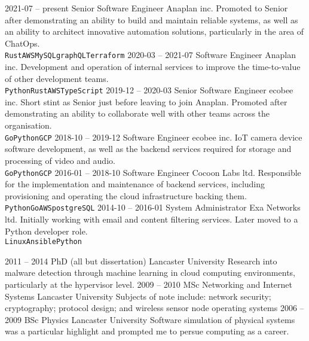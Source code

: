 \documentclass[9pt]{developercv} %
\begin{document}
\begin{entrylist}
	\entry
		{2021-07 -- present}
		{Senior Software Engineer}
		{Anaplan inc.}
		{Promoted to Senior after demonstrating an ability to build and maintain reliable systems, as well as an ability to architect innovative automation solutions, particularly in the area of ChatOps.\\
		\texttt{Rust}\slashsep\texttt{AWS}\slashsep\texttt{MySQL}\slashsep\texttt{graphQL}\slashsep\texttt{Terraform}}
	\entry
		{2020-03 -- 2021-07}
		{Software Engineer}
		{Anaplan inc.}
		{Development and operation of internal services to improve the time-to-value of other development teams.\\
		\texttt{Python}\slashsep\texttt{Rust}\slashsep\texttt{AWS}\slashsep\texttt{TypeScript}}
	\entry
		{2019-12 -- 2020-03}
		{Senior Software Engineer}
		{ecobee inc.}
		{Short stint as Senior just before leaving to join Anaplan. Promoted after demonstrating an ability to collaborate well with other teams across the organisation.\\
		\texttt{Go}\slashsep\texttt{Python}\slashsep\texttt{GCP}}
	\entry
		{2018-10 -- 2019-12}
		{Software Engineer}
		{ecobee inc.}
		{IoT camera device software development, as well as the backend services required for storage and processing of video and audio.\\
		\texttt{Go}\slashsep\texttt{Python}\slashsep\texttt{GCP}}
	\entry
		{2016-01 -- 2018-10}
		{Software Engineer}
		{Cocoon Labs ltd.}
		{Responsible for the implementation and maintenance of backend services, including provisioning and operating the cloud infrastructure backing them.\\
		\texttt{Python}\slashsep\texttt{Go}\slashsep\texttt{AWS}\slashsep\texttt{postgreSQL}}
	\entry
		{2014-10 -- 2016-01}
		{System Administrator}
		{Exa Networks ltd.}
		{Initially working with email and content filtering services. Later moved to a Python developer role.\\
		\texttt{Linux}\slashsep\texttt{Ansible}\slashsep\texttt{Python}}
\end{entrylist}



\begin{entrylist}
	\entry
		{2011 -- 2014}
		{PhD (all but dissertation)}
		{Lancaster University}
		{Research into malware detection through machine learning in cloud computing environments, particularly at the hypervisor level.}
	\entry
		{2009 -- 2010}
		{MSc Networking and Internet Systems}
		{Lancaster University}
		{Subjects of note include: network security; cryptography; protocol design; and wireless sensor node operating systems}
	\entry
		{2006 -- 2009}
		{BSc Physics}
		{Lancaster University}
		{Software simulation of physical systems was a particular highlight and prompted me to persue computing as a career.}
\end{entrylist}
\end{document}
